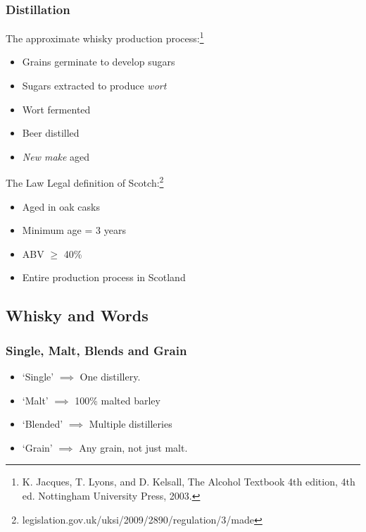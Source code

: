 \documentclass{beamer}
\begin{document}
\begin{frame}
    \frametitle{Distillation}
    The approximate whisky production process:\footnote{K. Jacques, T. Lyons, and D. Kelsall, The Alcohol Textbook 4th edition, 4th ed. Nottingham
    University Press, 2003.}
    \begin{itemize}
        \item Grains germinate to develop sugars
        \item Sugars extracted to produce \emph{wort}
        \item Wort fermented
        \item Beer distilled
        \item \emph{New make} aged
    \end{itemize}

    \begin{block}{The Law}
        Legal definition of Scotch:\footnote{legislation.gov.uk/uksi/2009/2890/regulation/3/made}
        \begin{itemize}
            \item Aged in oak casks
            \item Minimum age = 3 years
            \item ABV $\geq$ 40\%
            \item Entire production process in Scotland
        \end{itemize}
        
    \end{block}
\end{frame}

\subsection{Whisky and Words}
\begin{frame}
    \frametitle{Single, Malt, Blends and Grain}
    \begin{itemize}
        \item `Single' $\implies$ One distillery.
        \item `Malt' $\implies$ 100\% malted barley
        \item `Blended' $\implies$ Multiple distilleries
        \item `Grain' $\implies$ Any grain, not just malt.
    \end{itemize}
    
\end{frame}
\end{document}
